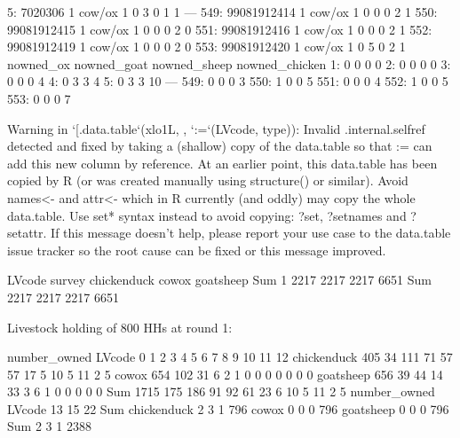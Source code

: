 \begin{Schunk}
\begin{Soutput}
  5:     7020306      1 cow/ox            1    0    3    0    1          1
 ---                                                                      
549: 99081912414      1 cow/ox            1    0    0    0    2          1
550: 99081912415      1 cow/ox            1    0    0    0    2          0
551: 99081912416      1 cow/ox            1    0    0    0    2          1
552: 99081912419      1 cow/ox            1    0    0    0    2          0
553: 99081912420      1 cow/ox            1    0    5    0    2          1
     nowned_ox nowned_goat nowned_sheep nowned_chicken
  1:         0           0            0              0
  2:         0           0            0              0
  3:         0           0            0              4
  4:         0           3            3              4
  5:         0           3            3             10
 ---                                                  
549:         0           0            0              3
550:         1           0            0              5
551:         0           0            0              4
552:         1           0            0              5
553:         0           0            0              7
\end{Soutput}
\begin{Soutput}
Warning in `[.data.table`(xlo1L, , `:=`(LVcode, type)): Invalid .internal.selfref detected and fixed by taking a (shallow) copy of the data.table so that := can add this new column by reference. At an earlier point, this data.table has been copied by R (or was created manually using structure() or similar). Avoid names<- and attr<- which in R currently (and oddly) may copy the whole data.table. Use set* syntax instead to avoid copying: ?set, ?setnames and ?setattr. If this message doesn't help, please report your use case to the data.table issue tracker so the root cause can be fixed or this message improved.
\end{Soutput}
\begin{Soutput}
      LVcode
survey chickenduck cowox goatsheep  Sum
   1          2217  2217      2217 6651
   Sum        2217  2217      2217 6651
\end{Soutput}
\end{Schunk}
Livestock holding of 800 HHs at round 1:
\begin{Schunk}
\begin{Soutput}
             number_owned
LVcode           0    1    2    3    4    5    6    7    8    9   10   11   12
  chickenduck  405   34  111   71   57   57   17    5   10    5   11    2    5
  cowox        654  102   31    6    2    1    0    0    0    0    0    0    0
  goatsheep    656   39   44   14   33    3    6    1    0    0    0    0    0
  Sum         1715  175  186   91   92   61   23    6   10    5   11    2    5
             number_owned
LVcode          13   15   22  Sum
  chickenduck    2    3    1  796
  cowox          0    0    0  796
  goatsheep      0    0    0  796
  Sum            2    3    1 2388
\end{Soutput}
\end{Schunk}

